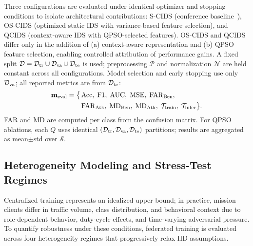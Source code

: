 \documentclass[conference]{IEEEtran}
\begin{document}
Three configurations
are evaluated under identical optimizer and stopping conditions
to isolate architectural contributions: S-CIDS (conference baseline~\cite{ajakweconquest}), OS-CIDS (optimized static
IDS with variance-based feature selection), and QCIDS
(context-aware IDS with QPSO-selected features). OS-CIDS and
QCIDS differ only in the addition of (a) context-aware
representation and (b) QPSO feature selection, enabling
controlled attribution of performance gains. A fixed split
$\mathcal{D}=\mathcal{D}_{\rm tr}\cup\mathcal{D}_{\rm va}
\cup\mathcal{D}_{\rm te}$ is used; preprocessing $\mathcal{P}$
and normalization $\mathcal{N}$ are held constant across all
configurations. Model selection and early stopping use only
$\mathcal{D}_{\rm va}$; all reported metrics are from
$\mathcal{D}_{\rm te}$:
\begin{align}
\mathbf{m}_{\rm eval} = \bigl\{
&\,\mathrm{Acc},\;\mathrm{F1},\;\mathrm{AUC},\;\mathrm{MSE},\;
  \mathrm{FAR}_{\rm Ben},\nonumber\\
&\,\mathrm{FAR}_{\rm Atk},\;\mathrm{MD}_{\rm Ben},\;
  \mathrm{MD}_{\rm Atk},\;
  \mathcal{T}_{\rm train},\;\mathcal{T}_{\rm infer}
\bigr\}.
\label{eq:central_metrics}
\end{align}
FAR and MD are computed per class from the confusion matrix.
For QPSO ablations, each $Q$ uses identical
$(\mathcal{D}_{\rm tr},\mathcal{D}_{\rm va},\mathcal{D}_{\rm te})$
partitions; results are aggregated as mean$\pm$std over
$\mathcal{S}$.

\subsection{Heterogeneity Modeling and Stress-Test Regimes}
\label{subsec:heterogeneity_modeling}

Centralized training represents an idealized upper bound; in
practice, mission clients differ in traffic volume, class
distribution, and behavioral context due to role-dependent
behavior, duty-cycle effects, and time-varying adversarial
pressure. To quantify robustness under these conditions,
federated training is evaluated across four heterogeneity
regimes that progressively relax IID assumptions.
\end{document}
